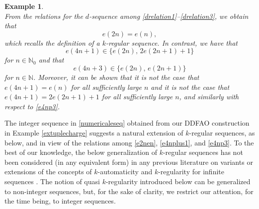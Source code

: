 \documentclass[12pt]{article}
\newtheorem{example}{Example}
\begin{document}
\begin{example}
\begin{equation}
\end{equation}
 From the relations for the $d$-sequence among \eqref{drelation1}--\eqref{drelation3}, we obtain that 
\begin{equation}\label{e2nen}
 e(2n) = e(n), 
\end{equation}
 which recalls the definition of a $k$-regular sequence. In contrast, we have that 
\begin{equation}\label{e4nplus1}
 e(4n+1) \in \{ e(2n), \, 2 e(2n+1) + 1 \} 
\end{equation}
 for $n \in \mathbb{N}_{0}$  and that 
\begin{equation}\label{e4np3}
 e(4n+3) \in \{ e(2n), \, e(2n+1) \} 
\end{equation}
 for $n \in \mathbb{N}$. 
 Moreover, it can be shown that it is not the case that 
 $e(4 n + 1) = e(n)$ for all sufficiently large $n$ and it is not the case that
 $e(4n+1) = 2 e(2n+1) + 1$ for all sufficiently large $n$, 
 and similarly with respect to \eqref{e4np3}. 
\end{example}

 The integer sequence in \eqref{numericaleseq} obtained from our DDFAO construction in 
 Example \ref{extuplecharge} suggests a natural extension of $k$-regular sequences, 
 as below, and in view of the relations among 
 \eqref{e2nen}, \eqref{e4nplus1}, and \eqref{e4np3}. 
 To the best of our knowledge, the below generalization of $k$-regular sequences 
 has not been considered (in any equivalent form) in any previous literature on 
 variants or extensions of the concepts of $k$-automaticity and $k$-regularity for infinite sequences 
 \cite{DressvonHaeseler2003,Konieczny2024,RowlandYassawi2017}. The notion of quasi $k$-regularity introduced below can be generalized 
 to non-integer sequences, 
 but, for the sake of clarity, we restrict our attention, for the time being, to integer sequences. 
\end{document}
